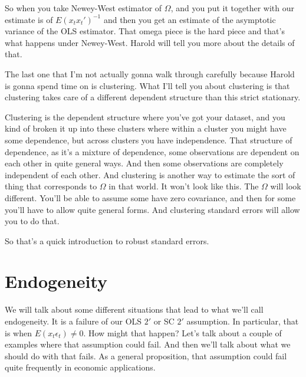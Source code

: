 \documentclass[11pt,a4paper]{amsart}
\theoremstyle{plain}
\theoremstyle{definition}
\begin{document}
		So when you take Newey-West estimator of $\Omega$, and you put it together with our estimate is of $E(x_{t}x_{t}')^{-1}$ and then you get an estimate of the asymptotic variance of the OLS estimator. That omega piece is the hard piece and that's what happens under Newey-West. Harold will tell you more about the details of that.\par 
		The last one that I'm not actually gonna walk through carefully because Harold is gonna spend time on is clustering. What I'll tell you about clustering is that clustering takes care of a different dependent structure than this strict stationary.\par 
		Clustering is the dependent structure where you've got your dataset, and you kind of broken it up into these clusters where within a cluster you might have some dependence, but across clusters you have independence. That structure of dependence, as it's a mixture of dependence, some observations are dependent on each other in quite general ways. And then some observations are completely independent of each other. 
		And clustering is another way to estimate the sort of thing that corresponds to $\Omega$ in that world. It won't look like this. The $\Omega$ will look different.  You'll be able to assume some have zero covariance, and then for some you'll have to allow quite general forms. And clustering standard errors will allow you to do that.\par
		So that's a quick introduction to robust standard errors.
		
\section{Endogeneity}
	 	We will talk about some different situations that lead to what we'll call endogeneity. It is a failure of our OLS $2'$ or SC $2'$ assumption. In particular, that is when $E(x_{t}\epsilon_{t}) \ne 0$. How might that happen? Let's talk about a couple of examples where that assumption could fail. And then we'll talk about what we should do with that fails.  As a general proposition, that assumption could fail quite frequently in economic applications.
\end{document}
